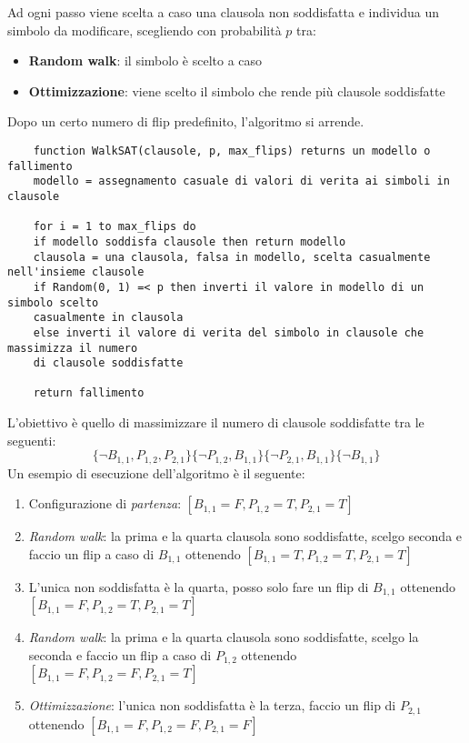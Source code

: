 Ad ogni passo viene scelta a caso una clausola non soddisfatta e individua un simbolo da modificare, scegliendo con probabilità $p$ tra:
\begin{itemize}
	\item \textbf{Random walk}: il simbolo è scelto a caso
	\item \textbf{Ottimizzazione}: viene scelto il simbolo che rende più clausole soddisfatte
\end{itemize}
Dopo un certo numero di flip predefinito, l'algoritmo si arrende.
\begin{lstlisting}
	function WalkSAT(clausole, p, max_flips) returns un modello o fallimento
	modello = assegnamento casuale di valori di verita ai simboli in clausole
	
	for i = 1 to max_flips do
	if modello soddisfa clausole then return modello
	clausola = una clausola, falsa in modello, scelta casualmente nell'insieme clausole
	if Random(0, 1) =< p then inverti il valore in modello di un simbolo scelto
	casualmente in clausola
	else inverti il valore di verita del simbolo in clausole che massimizza il numero
	di clausole soddisfatte
	
	return fallimento
\end{lstlisting}

\begin{example}[WalkSAT]
	L'obiettivo è quello di massimizzare il numero di clausole soddisfatte tra le seguenti:
	\begin{equation*}
		\{\neg B_{1,1}, P_{1,2}, P_{2,1}\}\{\neg P_{1,2}, B_{1,1}\}\{\neg P_{2,1}, B_{1,1}\}\{\neg B_{1,1}\}
	\end{equation*}
	Un esempio di esecuzione dell'algoritmo è il seguente:
	\begin{enumerate}
		\item Configurazione di \textit{partenza}: $[B_{1,1}=F,P_{1,2}=T,P_{2,1}=T]$
		\item \textit{Random walk}: la prima e la quarta clausola sono soddisfatte, scelgo seconda e faccio un flip a caso di $B_{1,1}$ ottenendo $[B_{1,1}=T,P_{1,2}=T,P_{2,1}=T]$
		\item L'unica non soddisfatta è la quarta, posso solo fare un flip di $B_{1,1}$ ottenendo $[B_{1,1}=F,P_{1,2}=T,P_{2,1}=T]$
		\item \textit{Random walk}: la prima e la quarta clausola sono soddisfatte, scelgo la seconda e faccio un flip a caso di $P_{1,2}$ ottenendo $[B_{1,1}=F,P_{1,2}=F,P_{2,1}=T]$
		\item \textit{Ottimizzazione}: l'unica non soddisfatta è la terza, faccio un flip di $P_{2,1}$ ottenendo $[B_{1,1}=F,P_{1,2}=F,P_{2,1}=F]$
	\end{enumerate}
\end{example}

